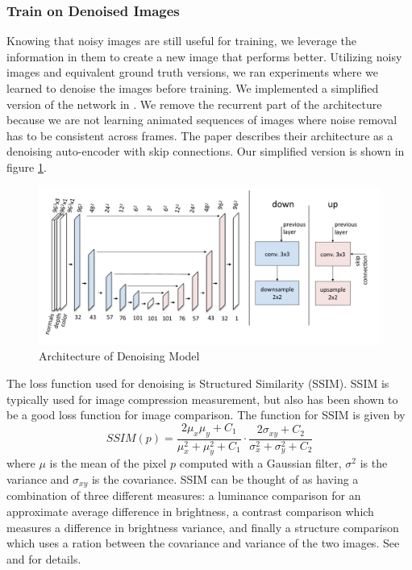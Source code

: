\documentclass[10pt,twocolumn,letterpaper]{article}
\begin{document}
\subsubsection{Train on Denoised Images} \label{denoising}
Knowing that noisy images are still useful for training, we leverage the information in them to create a new image that performs better. Utilizing noisy images and equivalent ground truth versions, we ran experiments where we learned to denoise the images before training.  We implemented a simplified version of the network in \cite{Chaitanya:2017:IRM:3072959.3073601}.  We remove the recurrent part of the architecture because we are not learning animated sequences of images where noise removal has to be consistent across frames. The paper describes their architecture as a denoising auto-encoder with skip connections.  Our simplified version is shown in figure \ref{fig:denoise}. 
\begin{figure}[h!]
\centering
\includegraphics[width=1.0\columnwidth]{./assets/denoiser_diagram.pdf}
\caption{Architecture of Denoising Model}
\label{fig:denoise}
\end{figure}

The loss function used for denoising is Structured Similarity (SSIM)\cite{Wang04imagequality}. SSIM is typically used for image compression measurement, but also has been shown to be a good loss function for image comparison. The function for SSIM is given by
$$SSIM(p)=\frac{2\mu_x\mu_y + C_1}{\mu_x^2+\mu_y^2+C_1}\cdot\frac{2\sigma_{xy}+C_2}{\sigma_x^2+\sigma_y^2+C_2}$$
where $\mu$ is the mean of the pixel $p$ computed with a Gaussian filter, $\sigma^2$ is the variance and $\sigma_{xy}$ is the covariance. SSIM can be thought of as having a combination of three different measures: a luminance comparison for an approximate average difference in brightness,  a contrast comparison which measures a difference in brightness variance, and finally a structure comparison which uses a ration between the covariance and variance of the two images.  See \cite{DBLP:journals/corr/ZhangSYSLJF16} and \cite{DBLP:journals/corr/ZhaoGFK15} for details.
\end{document}
